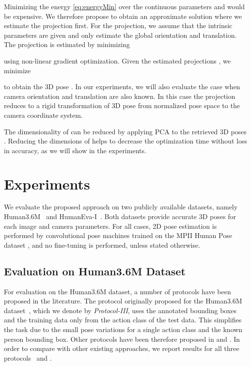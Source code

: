 \documentclass[10pt,journal,compsoc]{IEEEtran}
\begin{document}
Minimizing the energy  \eqref{eq:energyMin} over the continuous parameters  and  would be expensive.
We therefore propose to obtain an approximate solution where we estimate the projection  first.
For the projection, we assume that the intrinsic parameters are given and only estimate the global orientation and translation.
The projection  is estimated by minimizing

using non-linear gradient optimization. Given the estimated projections , we minimize

to obtain the 3D pose . In our experiments, we will also evaluate the case when camera orientation and translation are also known.
In this case the projection  reduces to a rigid transformation of 3D pose  from normalized pose space  
to the camera coordinate system. 

The dimensionality of  can be reduced by applying PCA to the retrieved 3D poses .
Reducing the dimensions of  helps to decrease the optimization time without loss in accuracy, as we will show in the experiments. 


\section{Experiments}\label{sec:exp}
We evaluate the proposed approach on two publicly available datasets, namely  Human3.6M~\cite{h36m_pami} and
HumanEva-I~\cite{Sigal_2010}. Both datasets provide accurate 3D poses for each image and camera parameters.
For all cases, 2D pose estimation is performed by convolutional pose machines \cite{wei2016convolutional} trained 
on the MPII Human Pose dataset \cite{andriluka14cvpr}, and no fine-tuning is performed, unless stated otherwise. 

\subsection{Evaluation on Human3.6M Dataset}
For evaluation on the Human3.6M dataset, a number of protocols have been proposed in the literature. The protocol originally proposed for the Human3.6M dataset~\cite{h36m_pami}, which we denote by \emph{Protocol-III}, uses the annotated bounding boxes
and the training data only from the action class of the test data. This simplifies the task due to the small
pose variations for a single action class and the known person bounding box. Other protocols have been therefore proposed in \cite{Ilya_2014} and \cite{bogo2016keep}. 
In order to compare with other existing approaches, we report results for all three protocols~\cite{Ilya_2014,bogo2016keep} and \cite{h36m_pami}.
\end{document}
